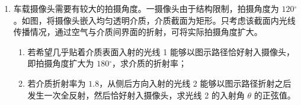 \documentclass[\gkver]{gaokaozhenti}
\begin{document}
\begin{enumerate}
{（3）图 4 中螺旋测微器读数为 $11 \Umm + 35.0 \times 0.01 \Umm = 11.350 \Umm$。

（4）数据如上表所示。

（5）根据表格中数据，在图 5 中描出第 4、5 组测量数据的坐标点，并作出 $z-U$ 图像，如图所示

\onepicture[w=8.0cm]{}

（6）分别读取所作直线上 $U=20\UmV$ 和 $60\UmV$ 处的 $z$ 坐标，位移大小为两读数之差。参考答案取 $12.15\Umm$ 和 $13.70\Umm$，相减为 $1.55\Umm$。从上图红线读数约为 $12.10\Umm$ 和 $13.70\Umm$，得到约 $1.60\Umm$；作图与读数会使所得数值略有差别。
}
\item
车载摄像头需要有较大的拍摄角度。一摄像头由于结构限制，拍摄角度为 $120{^\circ}$。如图，将摄像头嵌入均匀透明介质，介质截面为矩形。只考虑该截面内光线传播情况，通过空气与介质间界面的折射，可将实际拍摄角度扩大。
\begin{enumerate}
	\item
	若希望几乎贴着介质表面入射的光线 1 能够以图示路径恰好射入摄像头，即拍摄角度扩大为 $180{^\circ}$，求介质的折射率；
	\item
	若介质折射率为 $1.8$，从侧后方向入射的光线 2 能够以图示路径折射之后发生一次全反射，然后恰好射入摄像头，求光线 2 的入射角 $\theta$ 的正弦值。
\end{enumerate}
\onepicture[w=12.0cm, align=right]{}
\end{enumerate}
\end{document}
